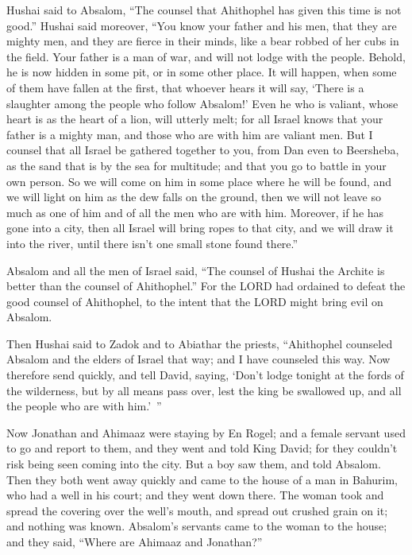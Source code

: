 \myverse{}Hushai said to Absalom, “The counsel that Ahithophel has given
this time is not good.”
\myverse{}Hushai said moreover, “You know your father and his men, that they are mighty
men, and they are fierce in their minds, like a bear robbed of her cubs in the field. Your father is a
man of war, and will not lodge with the people.
\myverse{}Behold, he is now hidden in some pit, or in some other place. It will happen,
when some of them have fallen at the first, that whoever hears it will say, ‘There is a slaughter among
the people who follow Absalom!’
\myverse{}Even he who is valiant, whose heart is as the heart of a lion, will utterly
melt; for all Israel knows that your father is a mighty man, and those who are with him are valiant men.
\myverse{}But I counsel that all Israel be gathered together to you, from Dan even
to Beersheba, as the sand that is by the sea for multitude; and that you go to battle in your own person.
\myverse{}So we will come on him in some place where he will be found, and we will
light on him as the dew falls on the ground, then we will not leave so much as one of him and of all the
men who are with him.
\myverse{}Moreover, if he has gone into a city, then all Israel will bring ropes to
that city, and we will draw it into the river, until there isn’t one small stone found there.”

\myverse{}Absalom and all the men of Israel said, “The counsel of Hushai
the Archite is better than the counsel of Ahithophel.” For the LORD had ordained to defeat the good counsel
of Ahithophel, to the intent that the LORD might bring evil on Absalom.

\myverse{}Then Hushai said to Zadok and to Abiathar the priests, “Ahithophel
counseled Absalom and the elders of Israel that way; and I have counseled this way.
\myverse{}Now therefore send quickly, and tell David, saying, ‘Don’t lodge tonight
at the fords of the wilderness, but by all means pass over, lest the king be swallowed up, and all the
people who are with him.’ ”

\myverse{}Now Jonathan and Ahimaaz were staying by En Rogel; and a female
servant used to go and report to them, and they went and told King David; for they couldn’t risk being
seen coming into the city.
\myverse{}But a boy saw them, and told Absalom. Then they both went away quickly and
came to the house of a man in Bahurim, who had a well in his court; and they went down there.
\myverse{}The woman took and spread the covering over the well’s mouth, and spread
out crushed grain on it; and nothing was known.
\myverse{}Absalom’s servants came to the woman to the house; and they said, “Where
are Ahimaaz and Jonathan?”

